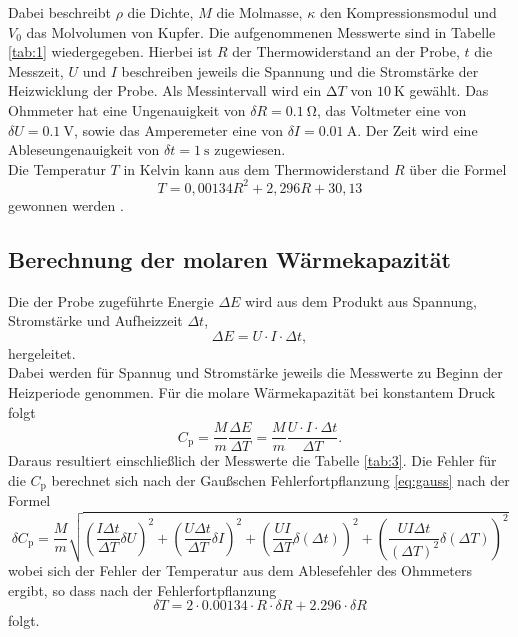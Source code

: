 Dabei beschreibt $\rho$ die Dichte, $M$ die Molmasse, $\kappa$ den Kompressionsmodul und $V_0$ das Molvolumen von Kupfer.
Die aufgenommenen Messwerte sind in Tabelle \ref{tab:1} wiedergegeben.
Hierbei ist $R$ der Thermowiderstand an der Probe, $t$ die Messzeit, $U$ und $I$ beschreiben jeweils die Spannung und die Stromstärke der Heizwicklung der Probe.
Als Messintervall wird ein $\increment T$ von $\SI{10}{\kelvin}$ gewählt.
Das Ohmmeter hat eine Ungenauigkeit von $\delta R = \SI{0.1}{\ohm}$, das Voltmeter eine von $\delta U = \SI{0.1}{\volt}$, sowie das Amperemeter eine von $\delta I = \SI{0.01}{\ampere}$.
Der Zeit wird eine Ableseungenauigkeit von $\delta t = \SI{1}{\second}$ zugewiesen.\\
Die Temperatur $T$ in Kelvin kann aus dem Thermowiderstand $R$ über die Formel
\begin{equation}
  T = 0,00134R^2+2,296R+30,13
\end{equation}
gewonnen werden \cite{skript}.


\newpage

\subsection{Berechnung der molaren Wärmekapazität}
Die der Probe zugeführte Energie $\Delta E$ wird aus dem Produkt aus Spannung, Stromstärke und Aufheizzeit $\Delta t$,
\begin{equation}
  \Delta E =  U\cdot I\cdot \Delta t,
\end{equation}
hergeleitet.\\
Dabei werden für Spannug und Stromstärke jeweils die Messwerte zu Beginn der Heizperiode genommen.
Für die molare Wärmekapazität bei konstantem Druck folgt
\begin{equation}
  C_{\text{p}} = \frac{M}{m}\frac{\Delta E}{\Delta T} = \frac{M}{m}\frac{U\cdot I\cdot \Delta t}{\Delta T}.
\end{equation}
Daraus resultiert einschließlich der Messwerte die Tabelle \ref{tab:3}.
Die Fehler für die $C_{\text{p}}$ berechnet sich nach der Gaußschen Fehlerfortpflanzung \eqref{eq:gauss} nach der Formel
\begin{equation}
  \delta C_\text{p} = \frac{M}{m} \sqrt{ \left(\frac{I \Delta t}{\Delta T} \delta U \right)^2 + \left( \frac{U \Delta t}{\Delta T} \delta I \right)^2 + \left(\frac{U I}{\Delta T} \delta(\Delta t) \right)^2 + \left( \frac{U I \Delta t}{(\Delta T)^2} \delta(\Delta T)\right)^2 }
\end{equation}
wobei sich der Fehler der Temperatur aus dem Ablesefehler des Ohmmeters ergibt, so dass nach der Fehlerfortpflanzung
\begin{equation}
 \delta T = 2 \cdot 0.00134 \cdot R \cdot \delta R + 2.296 \cdot \delta R
\end{equation}
folgt.


